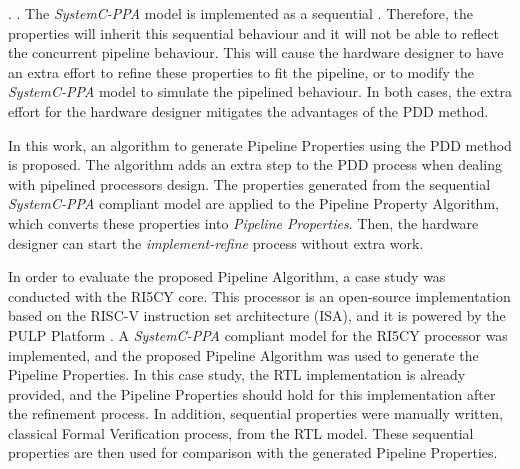 .  . 
 The \textit{SystemC-PPA} model is implemented as a sequential . Therefore, the properties will inherit this sequential behaviour and it will not be able to reflect the concurrent pipeline behaviour. This will cause the hardware designer to have an extra effort to refine these properties to fit the pipeline, or to modify the \textit{SystemC-PPA} model to simulate the pipelined behaviour. In both cases, the extra effort for the hardware designer mitigates the advantages of the PDD method.

In this work, an algorithm to generate Pipeline Properties using the PDD method is proposed. The algorithm adds an extra step to the PDD process when dealing with pipelined processors design. The properties generated from the sequential \textit{SystemC-PPA} compliant model are applied to the Pipeline Property Algorithm, which converts these properties into \textit{Pipeline Properties}. Then, the hardware designer can start the \textit{implement-refine} process without extra work.

In order to evaluate the proposed Pipeline Algorithm, a case study was conducted with the RI5CY  core. This processor is an open-source implementation based on the RISC-V instruction set architecture (ISA), and it is powered by the PULP Platform \cite{pulp}. A \textit{SystemC-PPA} compliant model for the RI5CY processor was implemented, and the proposed Pipeline Algorithm was used to generate the Pipeline Properties. In this case study, the RTL implementation is already provided, and the Pipeline Properties should hold for this implementation after the refinement process. In addition, sequential properties were manually written, classical Formal Verification process, from the RTL model. These sequential properties are then used for comparison with the generated Pipeline Properties. 


